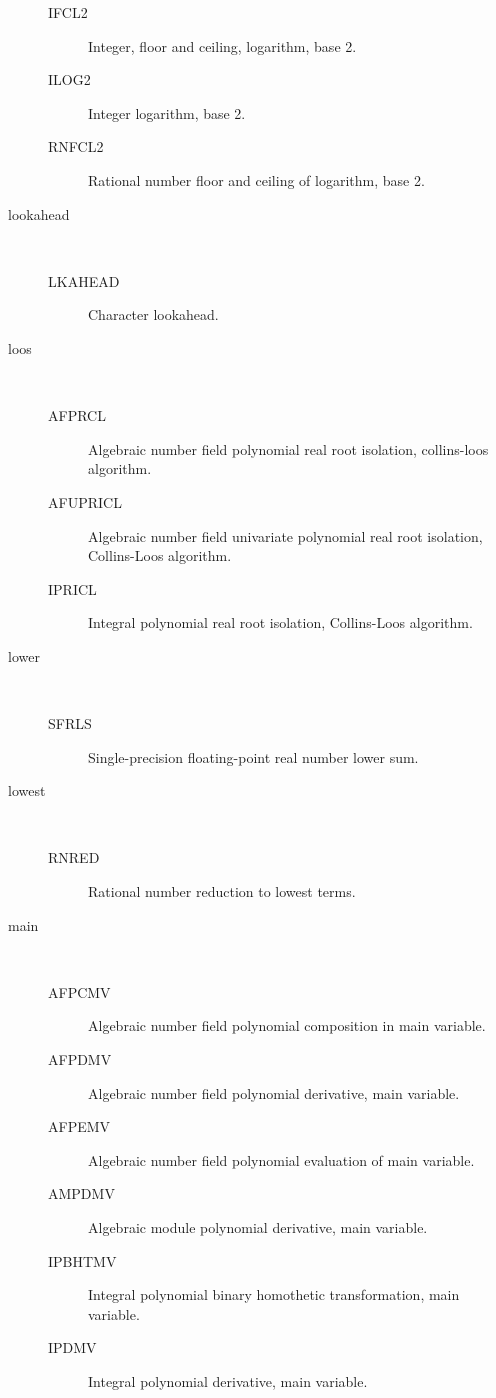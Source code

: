 \begin{description}
\begin{description}
  \item[IFCL2]  Integer, floor and ceiling, logarithm, base 2.
  \item[ILOG2]  Integer logarithm, base 2.
  \item[RNFCL2]  Rational number floor and ceiling of logarithm, base 2.
  \end{description}
\item[lookahead] \ \ 
  \begin{description}
  \item[LKAHEAD]  Character lookahead.
  \end{description}
\item[loos] \ \ 
  \begin{description}
  \item[AFPRCL]  Algebraic number field polynomial real root isolation,
    collins-loos algorithm.
  \item[AFUPRICL]  Algebraic number field univariate polynomial real root
    isolation, Collins-Loos algorithm.
  \item[IPRICL]  Integral polynomial real root isolation, Collins-Loos
    algorithm.
  \end{description}
\item[lower] \ \ 
  \begin{description}
  \item[SFRLS]  Single-precision floating-point real number lower sum.
  \end{description}
\item[lowest] \ \ 
  \begin{description}
  \item[RNRED]  Rational number reduction to lowest terms.
  \end{description}
\item[main] \ \ 
  \begin{description}
  \item[AFPCMV]  Algebraic number field polynomial composition in main
    variable.
  \item[AFPDMV]  Algebraic number field polynomial derivative, main variable.
  \item[AFPEMV]  Algebraic number field polynomial evaluation of main
    variable.
  \item[AMPDMV]  Algebraic module polynomial derivative, main variable.
  \item[IPBHTMV]  Integral polynomial binary homothetic transformation, main
    variable.
  \item[IPDMV]  Integral polynomial derivative, main variable.

\end{description}
\end{description}
